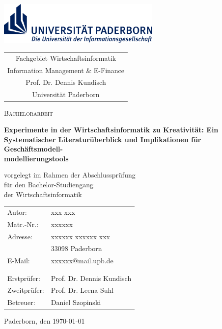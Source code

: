 \newcommand{\logo}{
	\includegraphics[width=0.6\textwidth]{_img/_pdf/Logo_Uni_Paderborn}\\
}
\newcommand{\fachbereich}{
	\begin{tabular}{c}
	Fachgebiet Wirtschaftsinformatik   \\
	Information Management \& E-Finance  \\
	Prof. Dr. Dennis Kundisch    \\
	Universität Paderborn   \\
	\end{tabular}
}
\newcommand{\titel}{
	Experimente in der Wirtschaftsinformatik zu Kreativität: Ein
	Systematischer Literaturüberblick und Implikationen für
	Geschäftsmodell-\\modellierungstools
}
\newcommand{\vorgelegtvon}{
	vorgelegt im Rahmen der Abschlussprüfung\\
	für den Bachelor-Studiengang\\
	der Wirtschaftsinformatik
}
\newcommand{\autorpruefer}{
	\begin{tabular}{ll}
      Autor: & xxx xxx \\
      Matr.-Nr.: & xxxxxx\\
      Adresse: & xxxxxx xxxxxx xxx\\
      & 33098 Paderborn\\
      E-Mail: & xxxxxx@mail.upb.de\\
      &\\
      &\\
      Erstprüfer: & Prof. Dr. Dennis Kundisch \\
      Zweitprüfer: & Prof. Dr. Leena Suhl \\
      Betreuer: & Daniel Szopinski \\
	\end{tabular}
}
\newcommand{\datum}{
	Paderborn, den \today
}

\begin{titlepage}
\singlespacing
\centering

\logo
\vspace{1cm}

\fachbereich \par
\vspace{2cm}

{\scshape\huge Bachelorarbeit \par}
\vspace{1.5cm}

{\LARGE\bfseries \titel \par}
\vspace{2cm}

\vorgelegtvon \par
\vspace{2cm}

{\autorpruefer \par}
\vfill

\datum
\end{titlepage}
